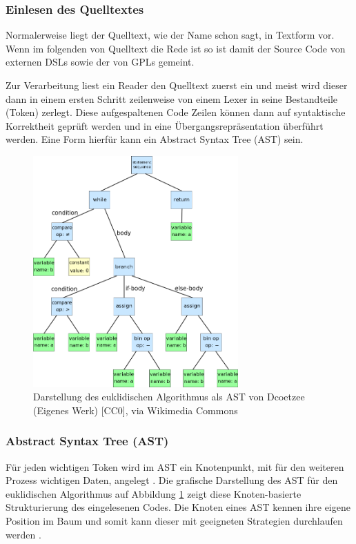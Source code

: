 \documentclass[12pt,oneside,a4paper,parskip]{scrbook}
\begin{document}
\subsubsection{Einlesen des Quelltextes}

Normalerweise liegt der Quelltext, wie der Name schon sagt, in Textform vor. Wenn im folgenden von Quelltext die Rede ist so ist damit der Source Code von externen DSLs sowie der von GPLs gemeint. 

Zur Verarbeitung liest ein Reader den Quelltext zuerst ein und meist wird dieser dann in einem ersten Schritt zeilenweise von einem Lexer in seine Bestandteile (Token) zerlegt. Diese aufgespaltenen Code Zeilen können dann auf syntaktische Korrektheit geprüft werden und in eine Übergangsrepräsentation überführt werden\cite[S. 29f.]{parr2009}. Eine Form hierfür kann ein Abstract Syntax Tree (AST) sein.

\begin{figure}[htbp]
	\centering
	\includegraphics[width=0.7\textwidth]{bilder/euclidean_algorithm_ast}
	\caption{Darstellung des euklidischen Algorithmus als AST von Dcoetzee (Eigenes Werk) [CC0], via Wikimedia Commons}
	\label{fig:ast}
\end{figure}

\subsubsection{Abstract Syntax Tree (AST)}

Für jeden wichtigen Token wird im AST ein Knotenpunkt, mit für den weiteren Prozess wichtigen Daten, angelegt \cite[S. 23]{parr2009}. Die grafische Darstellung  des AST für den euklidischen Algorithmus auf Abbildung \ref{fig:ast} zeigt diese Knoten-basierte Strukturierung des eingelesenen Codes. Die Knoten eines AST kennen ihre eigene Position im Baum und somit kann dieser mit geeigneten Strategien durchlaufen werden \cite[S. 24]{parr2009}.
\end{document}
